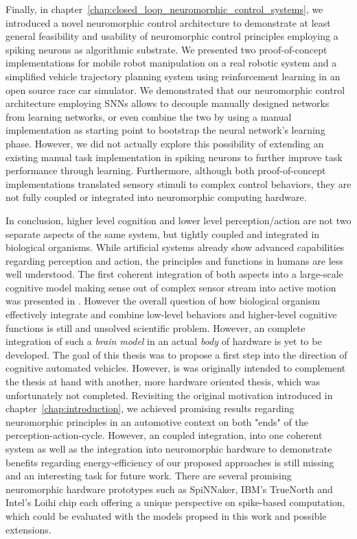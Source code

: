 Finally, in chapter~\ref{chap:closed_loop_neuromorphic_control_systems}, we introduced a novel neuromorphic control architecture to demonstrate at least general feasibility and usability of neuromorphic control principles employing a spiking neurons as algorithmic substrate.
We presented two proof-of-concept implementations for mobile robot manipulation on a real robotic system and a simplified vehicle trajectory planning system using reinforcement learning in an open source race car simulator.
We demonstrated that our neuromorphic control architecture employing \acp{SNN} allows to decouple manually designed networks from learning networks, or even combine the two by using a manual implementation as starting point to bootstrap the neural network's learning phase.
However, we did not actually explore this possibility of extending an existing manual task implementation in spiking neurons to further improve task performance through learning.
Furthermore, although both proof-of-concept implementations translated sensory stimuli to complex control behaviors, they are not fully coupled or integrated into neuromorphic computing hardware.

In conclusion, higher level cognition and lower level perception/action are not two separate aspects of the same system, but tightly coupled and integrated in biological organisms.
While artificial systems already show advanced capabilities regarding perception and action, the principles and functions in humans are less well understood.
The first coherent integration of both aspects into a large-scale cognitive model making sense out of complex sensor stream into active motion was presented in \cite{Eliasmith2012}.
However the overall question of how biological organism effectively integrate and combine low-level behaviors and higher-level cognitive functions is still and unsolved scientific problem.
However, an complete integration of such a \emph{brain model} in an actual \emph{body} of hardware is yet to be developed.
The goal of this thesis was to propose a first step into the direction of cognitive automated vehicles.
However, is was originally intended to complement the thesis at hand with another, more hardware oriented thesis, which was unfortunately not completed.
Revisiting the original motivation introduced in chapter~\ref{chap:introduction}, we achieved promising results regarding neuromorphic principles in an automotive context on both "ends" of the perception-action-cycle.
However, an coupled integration, into one coherent system as well as the integration into neuromorphic hardware to demonstrate benefits regarding energy-efficiency of our proposed approaches is still missing and an interesting task for future work.
There are several promising neuromorphic hardware prototypes such as \ac{SpiNNaker}, IBM's TrueNorth and Intel's Loihi chip each offering a unique perspective on spike-based computation, which could be evaluated with the models propsed in this work and possible extensions.

